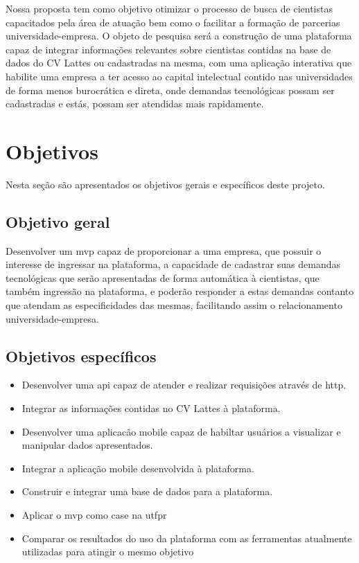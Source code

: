 Nossa proposta tem como objetivo otimizar o processo de busca de cientistas capacitados pela área de atuação bem como o facilitar a formação de parcerias universidade-empresa. O objeto de pesquisa será a construção de uma plataforma capaz de integrar informações relevantes sobre cientistas contidas na base de dados do CV Lattes ou cadastradas na mesma, com uma aplicação interativa que habilite uma empresa a ter acesso ao capital intelectual contido nas universidades de forma menos burocrática e direta, onde demandas tecnológicas possam ser cadastradas e estás, possam ser atendidas mais rapidamente.

\section{Objetivos}\label{sec:objetivos}

Nesta seção são apresentados os objetivos gerais e específicos deste projeto.

\subsection{Objetivo geral}\label{subsec:objetivoGeral}

Desenvolver um \gls{mvp} capaz de proporcionar a uma empresa, que possuir o interesse de ingressar na plataforma, a capacidade de cadastrar suas demandas tecnológicas que serão apresentadas de forma automática à cientistas, que também ingressão na plataforma, e poderão responder a estas demandas contanto que atendam as especificidades das mesmas, facilitando assim o relacionamento universidade-empresa.

\subsection{Objetivos específicos}\label{subsec:objetivosEspecificos}

\begin{itemize}
    \item Desenvolver uma \gls{api} capaz de atender e realizar requisições através de \gls{http}.
    \item Integrar as informações contidas no CV Lattes à plataforma.
    \item Desenvolver uma aplicacão mobile capaz de habiltar usuários a visualizar e manipular dados apresentados.
    \item Integrar a aplicação mobile desenvolvida à plataforma.
    \item Construir e integrar uma base de dados para a plataforma.
    \item Aplicar o \gls{mvp} como case na \gls{utfpr}
    \item Comparar os resultados do uso da plataforma com as ferramentas atualmente utilizadas para atingir o mesmo objetivo
\end{itemize}

